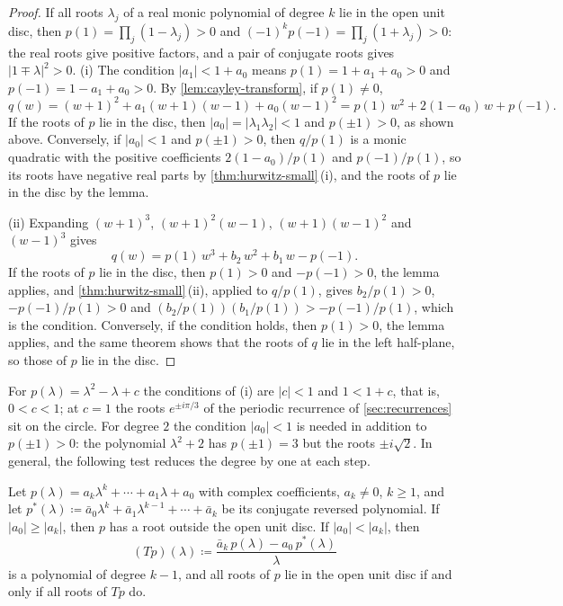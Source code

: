 \begin{proof}
If all roots $\lambda_j$ of a real monic polynomial of degree $k$ lie in the open unit disc, then $p(1)=\prod_j(1-\lambda_j)>0$ and $(-1)^kp(-1)=\prod_j(1+\lambda_j)>0$: the real roots give positive factors, and a pair of conjugate roots gives $|1\mp\lambda|^2>0$. (i) The condition $|a_1|<1+a_0$ means $p(1)=1+a_1+a_0>0$ and $p(-1)=1-a_1+a_0>0$. By \cref{lem:cayley-transform}, if $p(1)\ne0$,
\[
q(w)=(w+1)^2+a_1(w+1)(w-1)+a_0(w-1)^2=p(1)\,w^2+2(1-a_0)\,w+p(-1).
\]
If the roots of $p$ lie in the disc, then $|a_0|=|\lambda_1\lambda_2|<1$ and $p(\pm1)>0$, as shown above. Conversely, if $|a_0|<1$ and $p(\pm1)>0$, then $q/p(1)$ is a monic quadratic with the positive coefficients $2(1-a_0)/p(1)$ and $p(-1)/p(1)$, so its roots have negative real parts by \cref{thm:hurwitz-small}\,(i), and the roots of $p$ lie in the disc by the lemma.

(ii) Expanding $(w+1)^3$, $(w+1)^2(w-1)$, $(w+1)(w-1)^2$ and $(w-1)^3$ gives
\[
q(w)=p(1)\,w^3+b_2\,w^2+b_1\,w-p(-1).
\]
If the roots of $p$ lie in the disc, then $p(1)>0$ and $-p(-1)>0$, the lemma applies, and \cref{thm:hurwitz-small}\,(ii), applied to $q/p(1)$, gives $b_2/p(1)>0$, $-p(-1)/p(1)>0$ and $(b_2/p(1))(b_1/p(1))>-p(-1)/p(1)$, which is the condition. Conversely, if the condition holds, then $p(1)>0$, the lemma applies, and the same theorem shows that the roots of $q$ lie in the left half-plane, so those of $p$ lie in the disc.
\end{proof}

For $p(\lambda)=\lambda^2-\lambda+c$ the conditions of (i) are $|c|<1$ and $1<1+c$, that is, $0<c<1$; at $c=1$ the roots $e^{\pm i\pi/3}$ of the periodic recurrence of \cref{sec:recurrences} sit on the circle. For degree $2$ the condition $|a_0|<1$ is needed in addition to $p(\pm1)>0$: the polynomial $\lambda^2+2$ has $p(\pm1)=3$ but the roots $\pm i\sqrt2$. In general, the following test reduces the degree by one at each step.

\begin{theorem}
\label{thm:schur-cohn}
Let $p(\lambda)=a_k\lambda^k+\cdots+a_1\lambda+a_0$ with complex coefficients, $a_k\ne0$, $k\ge1$, and let $p^*(\lambda)\coloneqq\bar a_0\lambda^k+\bar a_1\lambda^{k-1}+\cdots+\bar a_k$ be its conjugate reversed polynomial. If $|a_0|\ge|a_k|$, then $p$ has a root outside the open unit disc. If $|a_0|<|a_k|$, then
\[
(Tp)(\lambda)\coloneqq\frac{\bar a_k\,p(\lambda)-a_0\,p^*(\lambda)}{\lambda}
\]
is a polynomial of degree $k-1$, and all roots of $p$ lie in the open unit disc if and only if all roots of $Tp$ do.
\end{theorem}

